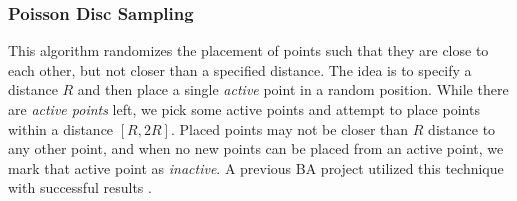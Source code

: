 \subsubsection{Poisson Disc Sampling}

This algorithm randomizes the placement of points such that they are close to each other, but not closer than a specified distance.
The idea is to specify a distance $R$ and then place a single \textit{active} point in a random position.
While there are \textit{active points} left, we pick some active points and attempt to place points within a distance $[R, 2R]$.
Placed points may not be closer than $R$ distance to any other point, and when no new points can be placed from an active point, we mark that active point as \textit{inactive}.
A previous BA project utilized this technique with successful results \cite{ba_landscape}.